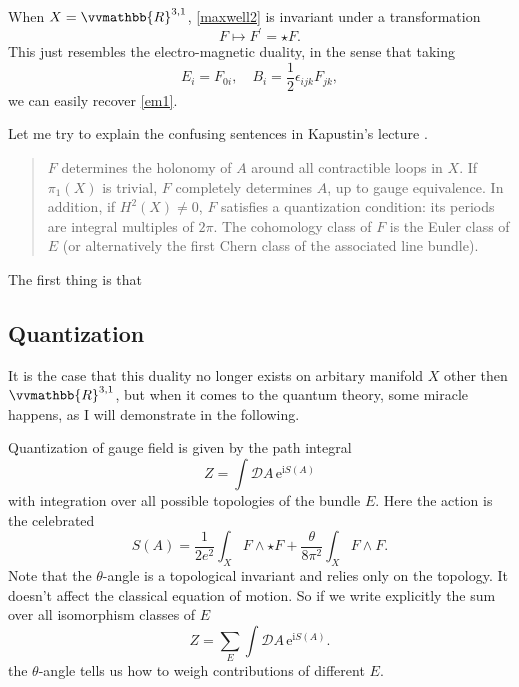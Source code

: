 \documentclass{article}
\newcommand{\ii}{\mathrm{i}}
\newcommand{\ee}{\mathrm{e}}
\numberwithin{equation}{section}
\begin{document}
When $X=\vvmathbb{R}^{3,1}$, \eqref{maxwell2} is invariant under a transformation
\begin{equation}
\label{em2}
F \mapsto F^{\prime}=\star F .
\end{equation}
This just resembles the electro-magnetic duality, in the sense that taking
\begin{equation}
E_i=F_{0 i}, \quad B_i=\frac{1}{2} \epsilon_{i j k} F_{j k},
\end{equation}
we can easily recover \eqref{em1}.

Let me try to explain the confusing sentences in Kapustin's lecture \cite{Kapustin:2009ygz}.
\begin{quote}
    $F$ determines the holonomy of $A$ around all contractible loops in $X$. If $\pi_1(X)$ is trivial, $F$ completely determines $A$, up to gauge equivalence. In addition, if $H^2(X)\neq 0$, $F$ satisfies a quantization condition: its periods are integral multiples of $2\pi$. The cohomology class of $F$ is the Euler class of $E$ (or alternatively the first Chern class of the associated line bundle).
\end{quote}
The first thing is that

\subsection{Quantization}
It is the case that this duality no longer exists on arbitary manifold $X$ other then $\vvmathbb{R}^{3,1}$, but when it comes to the quantum theory, some miracle happens, as I will demonstrate in the following.

Quantization of gauge field is given by the path integral
\begin{equation}
Z=\int \mathcal{D} A\, \ee^{\ii S(A)}
\end{equation}
with integration over all possible topologies of the bundle $E$. Here the action is the celebrated
\begin{equation}
S(A)=\frac{1}{2 e^2} \int_X F \wedge \star F+\frac{\theta}{8 \pi^2} \int_X F \wedge F.
\end{equation}
Note that the $\theta$-angle is a topological invariant and relies only on the topology. It doesn't affect the classical equation of motion. So if we write explicitly the sum over all isomorphism classes of $E$
\begin{equation}
Z=\sum_E \int \mathcal{D} A\, \ee^{\ii S(A)}.
\end{equation}
the $\theta$-angle tells us how to weigh contributions of different $E$.
\end{document}
